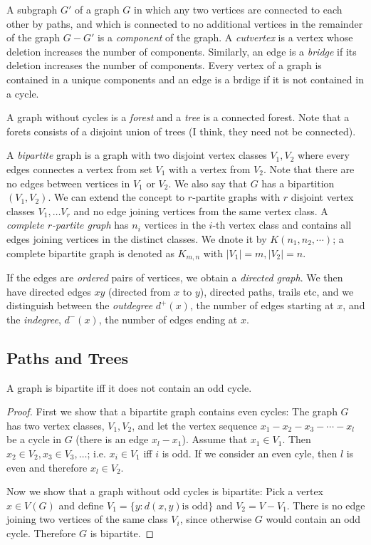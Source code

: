 A subgraph $G'$ of a graph $G$ in which any two vertices are connected to each other by paths, and which is connected to no additional vertices in the remainder of the graph $G - G'$ is a \emph{component} of the graph. A \emph{cutvertex} is a vertex whose deletion increases the number of components. Similarly, an edge is a \emph{bridge} if its deletion increases the number of components. Every vertex of a graph is contained in a unique components and an edge is a brdige if it is not contained in a cycle.

A graph without cycles is a \emph{forest} and a \emph{tree} is a connected forest. Note that a forets consists of a disjoint union of trees (I think, they need not be connected).

A \emph{bipartite} graph is a graph with two disjoint vertex classes $V_1, V_2$ where every edges connectes a vertex from set $V_1$ with a vertex from $V_2$. Note that there are no edges between vertices in $V_1$ or $V_2$. We also say that $G$ has a bipartition $(V_1, V_2)$. We can extend the concept to $r$-partite graphs with $r$ disjoint vertex classes $V_1, \ldots V_r$ and no edge joining vertices from the same vertex class. A \emph{complete $r$-partite graph} has $n_i$ vertices in the $i$-th vertex class and contains all edges joining vertices in the distinct classes. We dnote it by $K(n_1, n_2, \cdots)$; a complete bipartite graph is denoted as $K_{m,n}$ with $|V_1|=m, |V_2|=n$.

If the edges are \emph{ordered} pairs of vertices, we obtain a \emph{directed graph}. We then have directed edges $xy$ (directed from $x$ to $y$), directed paths, trails etc, and we distinguish between the \emph{outdegree} $d^+(x)$, the number of edges starting at $x$, and the \emph{indegree}, $d^-(x)$, the number of edges ending at $x$.

\subsection{Paths and Trees}

\begin{theorem}
  A graph is bipartite iff it does not contain an odd cycle.
\end{theorem}

\begin{proof}
  First we show that a bipartite graph contains even cycles: The graph $G$ has two vertex classes, $V_1, V_2$, and let the vertex sequence $x_1-x_2-x_3- \cdots - x_l$ be a cycle in $G$ (there is an edge $x_l - x_1$). Assume that $x_1 \in V_1$. Then $x_2 \in V_2, x_3 \in V_3,\ldots$; i.e. $x_i \in V_1$ iff $i$ is odd. If we consider an even cyle, then $l$ is even and therefore $x_l \in V_2$.

  Now we show that a graph without odd cycles is bipartite: Pick a vertex $x \in V(G)$ and define $V_1 = \{y: d(x,y) \text{is odd}\}$ and $V_2 = V - V_1$. There is no edge joining two vertices of the same class $V_i$, since otherwise $G$ would contain an odd cycle. Therefore $G$ is bipartite.
\end{proof}

